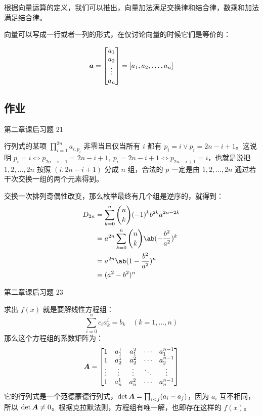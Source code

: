 根据向量运算的定义，我们可以推出，向量加法满足交换律和结合律，数乘和加法满足结合律。

向量可以写成一行或者一列的形式，在仅讨论向量的时候它们是等价的：

$$
\boldsymbol{a} = \begin{bmatrix}
	a_1 \\ a_2 \\ \vdots \\ a_n
\end{bmatrix} = [a_1, a_2, \dots, a_n]
$$

\subsection{作业}

\begin{problem}
	第二章课后习题 21
	
	\begin{solution}
		行列式的某项 $\prod_{i=1}^{2n} a_{i,p_i}$ 非零当且仅当所有 $i$ 都有 $p_i=i \lor p_i=2n-i+1$。这说明 $p_i=i \Leftrightarrow p_{2n-i+1}=2n-i+1,\ p_i=2n-i+1 \Leftrightarrow p_{2n-i+1}=i$，也就是说把 $1,2,\dots,2n$ 按照 $(i,2n-i+1)$ 分成 $n$ 组，合法的 $p$ 一定是由 $1,2,\dots,2n$ 通过若干次交换一组的两个元素得到。

		交换一次排列奇偶性改变，那么枚举最终有几个组是逆序的，就得到：
		$$
		\begin{aligned}
			D_{2n} & = \sum_{k=0}^n \binom{n}{k} (-1)^k b^{2k} a^{2n-2k} \\
			& = a^{2n} \sum_{k=0}^n \binom{n}{k} \ab(-\frac{b^2}{a^2})^k \\
			& = a^{2n} \ab(1 - \frac{b^2}{a^2})^n \\
			& = (a^2 - b^2)^n
		\end{aligned}
		$$

	\end{solution}
\end{problem}

\begin{problem}
	第二章课后习题 23

	\begin{solution}
		求出 $f(x)$ 就是要解线性方程组：
		$$
		\sum_{i=0}^n c_i a_k^i = b_k \quad (k=1,\dots,n)
		$$
		那么这个方程组的系数矩阵为：
		$$
		\boldsymbol{A} = \begin{bmatrix}
			1 & a_1^1 & a_1^2 & \cdots & a_1^{n-1} \\
			1 & a_2^1 & a_2^2 & \cdots & a_2^{n-1} \\
			\vdots & \vdots & \vdots & \ddots & \vdots \\
			1 & a_n^1 & a_n^2 & \cdots & a_n^{n-1}
		\end{bmatrix}
		$$
		它的行列式是一个范德蒙德行列式，$\det \boldsymbol{A} = \prod_{i<j} (a_i - a_j)$，因为 $a_i$ 互不相同，所以 $\det \boldsymbol{A} \neq 0$。根据克拉默法则，方程组有唯一解，也即存在这样的 $f(x)$。
	\end{solution}
\end{problem}

